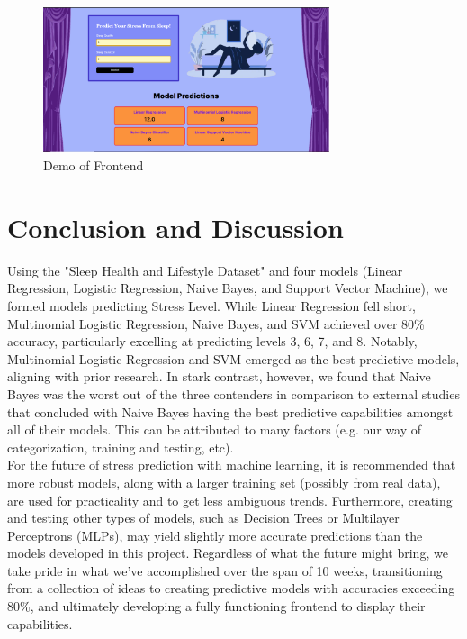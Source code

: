\documentclass[11pt, letterpaper]{article}
\begin{document}
    \begin{figure}[H]
        \centering
        \includegraphics[width=0.75\textwidth]{frontend.png}
        \caption{Demo of Frontend}
        \label{fig:frontend}
    \end{figure}

    \section*{Conclusion and Discussion}
    \noindent Using the "Sleep Health and Lifestyle Dataset" and four models (Linear Regression, Logistic Regression, Naive Bayes, and Support Vector Machine), we formed models predicting Stress Level. While Linear Regression fell short, Multinomial Logistic Regression, Naive Bayes, and SVM achieved over 80\% accuracy, particularly excelling at predicting levels 3, 6, 7, and 8. Notably, Multinomial Logistic Regression and SVM emerged as the best predictive models, aligning with prior research. In stark contrast, however, we found that Naive Bayes was the worst out of the three contenders in comparison to external studies that concluded with Naive Bayes having the best predictive capabilities amongst all of their models. This can be attributed to many factors (e.g. our way of categorization, training and testing, etc).\\
    
    \noindent For the future of stress prediction with machine learning, it is recommended that more robust models, along with a larger training set (possibly from real data), are used for practicality and to get less ambiguous trends. Furthermore, creating and testing other types of models, such as Decision Trees or Multilayer Perceptrons (MLPs), may yield slightly more accurate predictions than the models developed in this project. Regardless of what the future might bring, we take pride in what we’ve accomplished over the span of 10 weeks, transitioning from a collection of ideas to creating predictive models with accuracies exceeding 80\%, and ultimately developing a fully functioning frontend to display their capabilities.
\end{document}
